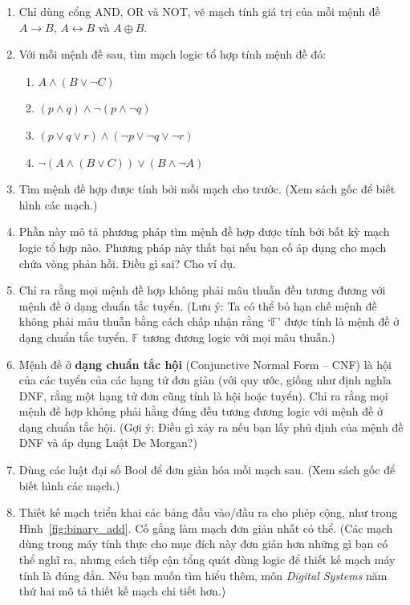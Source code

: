 \begin{enumerate}
\item[1.] Chỉ dùng cổng AND, OR và NOT, vẽ mạch tính giá trị của mỗi mệnh đề $A \to B$, $A \leftrightarrow B$ và $A \oplus B$.

\item[2.] Với mỗi mệnh đề sau, tìm mạch logic tổ hợp tính mệnh đề đó:
\begin{enumerate}[label=\alph*)]
\item $A \land (B \lor \lnot C)$
\item $(p \land q) \land \lnot(p \land \lnot q)$
\item $(p \lor q \lor r) \land (\lnot p \lor \lnot q \lor \lnot r)$
\item $\lnot(A \land (B \lor C)) \lor (B \land \lnot A)$
\end{enumerate}

\item[3.] Tìm mệnh đề hợp được tính bởi mỗi mạch cho trước. (Xem sách gốc để biết hình các mạch.)

\item[4.] Phần này mô tả phương pháp tìm mệnh đề hợp được tính bởi bất kỳ mạch logic tổ hợp nào. Phương pháp này thất bại nếu bạn cố áp dụng cho mạch chứa vòng phản hồi. Điều gì sai? Cho ví dụ.

\item[5.] Chỉ ra rằng mọi mệnh đề hợp không phải mâu thuẫn đều tương đương với mệnh đề ở dạng chuẩn tắc tuyển. (Lưu ý: Ta có thể bỏ hạn chế mệnh đề không phải mâu thuẫn bằng cách chấp nhận rằng `$\mathbb{F}$' được tính là mệnh đề ở dạng chuẩn tắc tuyển. $\mathbb{F}$ tương đương logic với mọi mâu thuẫn.)

\item[6.] Mệnh đề ở \textbf{dạng chuẩn tắc hội} (Conjunctive Normal Form -- CNF) là hội của các tuyển của các hạng tử đơn giản (với quy ước, giống như định nghĩa DNF, rằng một hạng tử đơn cũng tính là hội hoặc tuyển). Chỉ ra rằng mọi mệnh đề hợp không phải hằng đúng đều tương đương logic với mệnh đề ở dạng chuẩn tắc hội. (Gợi ý: Điều gì xảy ra nếu bạn lấy phủ định của mệnh đề DNF và áp dụng Luật De Morgan?)

\item[7.] Dùng các luật đại số Bool để đơn giản hóa mỗi mạch sau. (Xem sách gốc để biết hình các mạch.)

\item[8.] Thiết kế mạch triển khai các bảng đầu vào/đầu ra cho phép cộng, như trong Hình~\ref{fig:binary_add}. Cố gắng làm mạch đơn giản nhất có thể. (Các mạch dùng trong máy tính thực cho mục đích này đơn giản hơn những gì bạn có thể nghĩ ra, nhưng cách tiếp cận tổng quát dùng logic để thiết kế mạch máy tính là đúng đắn. Nếu bạn muốn tìm hiểu thêm, môn \emph{Digital Systems} năm thứ hai mô tả thiết kế mạch chi tiết hơn.)
\end{enumerate}
